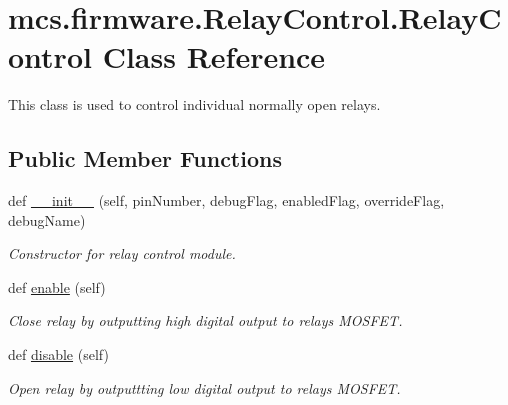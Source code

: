 \hypertarget{classmcs_1_1firmware_1_1RelayControl_1_1RelayControl}{}\section{mcs.\+firmware.\+Relay\+Control.\+Relay\+Control Class Reference}
\label{classmcs_1_1firmware_1_1RelayControl_1_1RelayControl}


This class is used to control individual normally open relays.  


\subsection*{Public Member Functions}
\begin{DoxyCompactItemize}
\item 
def \hyperlink{classmcs_1_1firmware_1_1RelayControl_1_1RelayControl_aefe5ade8212d8cd292790a65d1ddc539}{\+\_\+\+\_\+init\+\_\+\+\_\+} (self, pin\+Number, debug\+Flag, enabled\+Flag, override\+Flag, debug\+Name)
\begin{DoxyCompactList}\small\item\em Constructor for relay control module. \end{DoxyCompactList}\item 
\mbox{\label{classmcs_1_1firmware_1_1RelayControl_1_1RelayControl_a4429d108e4283b2daaeabd302a40616d}} 
def \hyperlink{classmcs_1_1firmware_1_1RelayControl_1_1RelayControl_a4429d108e4283b2daaeabd302a40616d}{enable} (self)
\begin{DoxyCompactList}\small\item\em Close relay by outputting high digital output to relay\textquotesingle{}s M\+O\+S\+F\+ET. \end{DoxyCompactList}\item 
\mbox{\label{classmcs_1_1firmware_1_1RelayControl_1_1RelayControl_ab1a16c37e9de0fab604ed2e27566bbac}} 
def \hyperlink{classmcs_1_1firmware_1_1RelayControl_1_1RelayControl_ab1a16c37e9de0fab604ed2e27566bbac}{disable} (self)
\begin{DoxyCompactList}\small\item\em Open relay by outputtting low digital output to relay\textquotesingle{}s M\+O\+S\+F\+ET. \end{DoxyCompactList}\end{DoxyCompactItemize}
